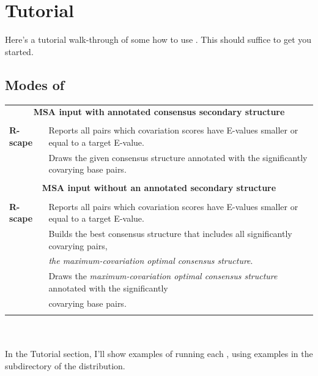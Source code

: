 
\section{Tutorial}
\label{section:tutorial}
\setcounter{footnote}{0}

Here's a tutorial walk-through of some how to use \rscape. This should
suffice to get you started.

\subsection {Modes of \rscape}

\begin{tabular}{ll}
\multicolumn{2}{c}{\textbf{MSA input with annotated consensus secondary structure}} \\ 
 & \\ 
\textbf{R-scape}   & Reports all pairs which covariation scores have E-values smaller or equal to a target E-value.\\
\textbf{}          & Draws the given consensus structure annotated with the significantly covarying base pairs.\\
 & \\ 
\multicolumn{2}{c}{\textbf{MSA input without an annotated secondary structure}}  \\
 & \\ 
\textbf{R-scape}   & Reports all pairs which covariation scores have E-values smaller or equal to a target E-value.\\
\textbf{}          & Builds the best consensus structure that includes all significantly covarying pairs,\\
\textbf{}          & \hspace{5mm}\emph{the maximum-covariation optimal consensus structure}.\\
\textbf{}          & Draws the \emph{maximum-covariation optimal consensus structure} annotated with the significantly \\
\textbf{}          & \hspace{5mm}covarying base pairs.\\
 & \\ 
\end{tabular} \\
\\

In the Tutorial section, I'll show examples of running each \rscape,
using examples in the  subdirectory of the
distribution.


